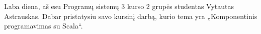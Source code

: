 \begin{comment}
  \TODO{Komponentinis modelis $\neq$ komponentinė realizacija. Surasti,
  kaip atsikirsti!}

  Turi būti viena pasakojimo gija.

  \begin{enumerate}
    \item Tematika (svarbiausių tematikos sąvokų apibrėžimai,
      įvadas į tematiką) - 1 skaidrė
    \item Problemos/uždavinio formulavimas (iš to turi išplaukti
      pagrindinė darbo tema) - 1 skaidrė
    \item Darbo tikslo formulavimas (jei sutampa su problemos
      formulavimu, tai kartoti nereikia) - 1 skaidrė
    \item Darbo planas (kaip pasieksite tikslą) - čia surašote
      punktus, kuriais buvo/bus pasiektas darbo tikslas - 1 skaidrė
    \item Temos gynimui (magistrantams): svarbiausios sąvokos
      (apibrėžimai, jei ilgi, neturi būti rašomi - turi būti sakomi
      žodžiu) - 2-3 skaidrės
    \item Darbo gynimui (bakalaurams, magistrantams): darbo metu
      iškilusios problemos, esminiai priimti sprendimai, kas buvo
      padaryta jūsų pačių ("susipažinau", "sukonspektavau",
      "išsiaiškinau", "išmokau" tinka tik kursiniams darbams!) - 3-6
      skaidrės
    \item (Laukiami) rezultatai - sąrašo pavidalu, ne daugiau trijų.
      "Susipažinau", "sukonspektavau", "išsiaiškinau", "išmokau" tinka
      tik kursiniams darbams! - 1 skaidrė
    \item Išvados - sąrašo pavidalu, ne daugiau trijų (temos gynime
      nereikia) - 1 skaidrė. Nebandykite rezultatų, pastebėjimų,
      komentarų, nuomonių apiforminti kaip išvadų!
  \end{enumerate}

  Pristatymo tikslas: supažindinti komisiją su darbu.
  1.  Darbo tikslas ir uždaviniai – planas.
  2.  Kas buvo padaryta – realizacija.
  3.  Rezultatai ir išvados.

  1.  Ko siekta.
  2.  Kaip siekta.
  3.  Kas pasiekta.
\end{comment}

\begin{handout}
  Laba diena, aš esu Programų sistemų 3 kurso 2 grupės studentas
  Vytautas Astrauskas. Dabar pristatysiu savo kursinį darbą, kurio
  tema yra „Komponentinis programavimas su Scala“.
\end{handout}

